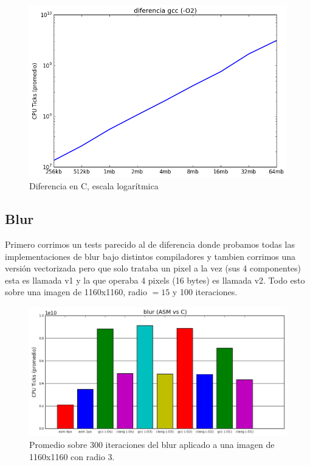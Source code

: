 \documentclass[a4paper]{article}
\begin{document}
\begin{figure}[h]
	\centerline{\includegraphics[scale=0.60]{imagenes/test_performance_size_C.png}}
	\caption{Diferencia en C, escala logarítmica}
\end{figure}

\newpage

\subsection{Blur}
Primero corrimos un tests parecido al de diferencia donde probamos todas las implementaciones de blur bajo distintos compiladores y tambien corrimos una versión vectorizada pero que solo trataba un pixel a la vez (sus 4 componentes) esta es llamada v1 y la que operaba 4 pixels (16 bytes) es llamada v2. Todo esto sobre una imagen de 1160x1160, radio $= 15$ y 100 iteraciones.

\begin{figure}[h]
	\includegraphics[scale=0.75]{imagenes/test_blur_ASM_C_.png}
	\caption{Promedio sobre 300 iteraciones del blur aplicado a una imagen de 1160x1160 con radio 3.}
\end{figure}
\end{document}
